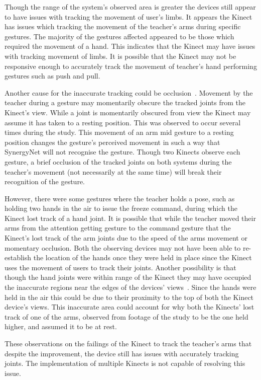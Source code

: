 \documentclass[manuscript, review, screen]{acmart}
\begin{document}
Though the range of the system's observed area is greater the devices still appear to have issues with tracking the movement of user's limbs.
It appears the Kinect has issues which tracking the movement of the teacher's arms during specific gestures.
The majority of the gestures affected appeared to be those which required the movement of a hand.
This indicates that the Kinect may have issues with tracking movement of limbs.
It is possible that the Kinect may not be responsive enough to accurately track the movement of teacher's hand performing gestures such as push and pull.

Another cause for the inaccurate tracking could be occlusion~\cite{Meng2012}.
Movement by the teacher during a gesture may momentarily obscure the tracked joints from the Kinect's view.
While a joint is momentarily obscured from view the Kinect may assume it has taken to a resting position.
This was observed to occur several times during the study.
This movement of an arm mid gesture to a resting position changes the gesture's perceived movement in such a way that SynergyNet will not recognise the gesture.
Though two Kinects observe each gesture, a brief occlusion of the tracked joints on both systems during the teacher's movement (not necessarily at the same time) will break their recognition of the gesture.

However, there were some gestures where the teacher holds a pose, such as holding two hands in the air to issue the freeze command, during which the Kinect lost track of a hand joint.
It is possible that while the teacher moved their arms from the attention getting gesture to the command gesture that the Kinect's lost track of the arm joints due to the speed of the arms movement or momentary occlusion.
Both the observing devices may not have been able to re-establish the location of the hands once they were held in place since the Kinect uses the movement of users to track their joints.
Another possibility is that though the hand joints were within range of the Kinect they may have occupied the inaccurate regions near the edges of the devices' views~\cite{Mehrotra2011}.
Since the hands were held in the air this could be due to their proximity to the top of both the Kinect device's views.
This inaccurate area could account for why both the Kinects' lost track of one of the arms, observed from footage of the study to be the one held higher, and assumed it to be at rest.

These observations on the failings of the Kinect to track the teacher's arms that despite the improvement, the device still has issues with accurately tracking joints.
The implementation of multiple Kinects is not capable of resolving this issue.
\end{document}
